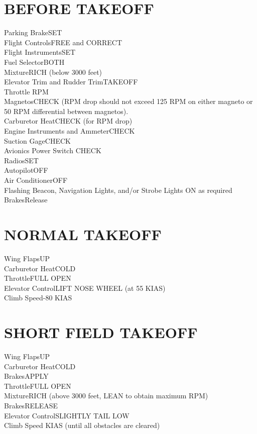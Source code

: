 \documentclass{article}
\begin{document}
\begin{multicols*}{2}
\section*{BEFORE TAKEOFF}
Parking Brake\dotfill SET\\
Flight Controls\dotfill FREE and CORRECT\\
Flight Instruments\dotfill SET\\
Fuel Selector\dotfill BOTH\\
Mixture\dotfill RICH (below 3000 feet)\\
Elevator Trim and Rudder Trim\dotfill TAKEOFF\\
Throttle RPM\\
\hspace*{6mm}Magnetos\dotfill CHECK (RPM drop should not exceed 125 RPM on either magneto or 50 RPM differential between magnetos).\\
\hspace*{6mm}Carburetor Heat\dotfill CHECK (for RPM drop)\\
\hspace*{6mm}Engine Instruments and Ammeter\dotfill CHECK\\
\hspace*{6mm}Suction Gage\dotfill CHECK\\
Avionics Power Switch \dotfill CHECK\\
Radios\dotfill SET\\
Autopilot\dotfill OFF\\
Air Conditioner\dotfill OFF\\
Flashing Beacon, Navigation Lights, and/or Strobe Lights \dotfill ON as required\\
Brakes\dotfill Release
\section*{NORMAL TAKEOFF}
Wing Flaps\dotfill UP\\
Carburetor Heat\dotfill COLD\\
Throttle\dotfill FULL OPEN\\
Elevator Control\dotfill LIFT NOSE WHEEL (at 55 KIAS)\\
Climb Speed-80 KIAS
\section*{SHORT FIELD TAKEOFF}
Wing Flaps\dotfill UP\\
Carburetor Heat\dotfill COLD\\
Brakes\dotfill APPLY\\
Throttle\dotfill FULL OPEN\\
Mixture\dotfill RICH (above 3000 feet, LEAN to obtain maximum RPM)\\
Brakes\dotfill RELEASE\\
Elevator Control\dotfill SLIGHTLY TAIL LOW\\
Climb Speed KIAS (until all obstacles are cleared)
\vfill\null

\end{multicols*}
\end{document}
